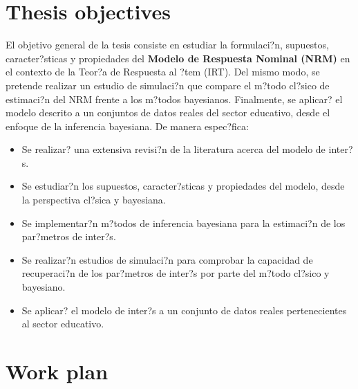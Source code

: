 \section{Thesis objectives}

El objetivo general de la tesis consiste en estudiar la formulaci?n, supuestos, caracter?sticas y propiedades del \textbf{Modelo de Respuesta Nominal (NRM)} en el contexto de la Teor?a de Respuesta al ?tem (IRT). Del mismo modo, se pretende realizar un estudio de simulaci?n que compare el m?todo cl?sico de estimaci?n del NRM frente a los m?todos bayesianos. Finalmente, se aplicar? el modelo descrito a un conjuntos de datos reales del sector educativo, desde el enfoque de la inferencia bayesiana. De manera espec?fica:

\begin{itemize}
\item Se realizar? una extensiva revisi?n de la literatura acerca del modelo de inter?s.
\item Se estudiar?n los supuestos, caracter?sticas y propiedades del modelo, desde la perspectiva cl?sica y bayesiana.
\item Se implementar?n m?todos de inferencia bayesiana para la estimaci?n de los par?metros de inter?s.
\item Se realizar?n estudios de simulaci?n para comprobar la capacidad de recuperaci?n de los par?metros de inter?s por parte del m?todo cl?sico y bayesiano.
\item Se aplicar? el modelo de inter?s a un conjunto de datos reales pertenecientes al sector educativo.
\end{itemize}




\section{Work plan}

